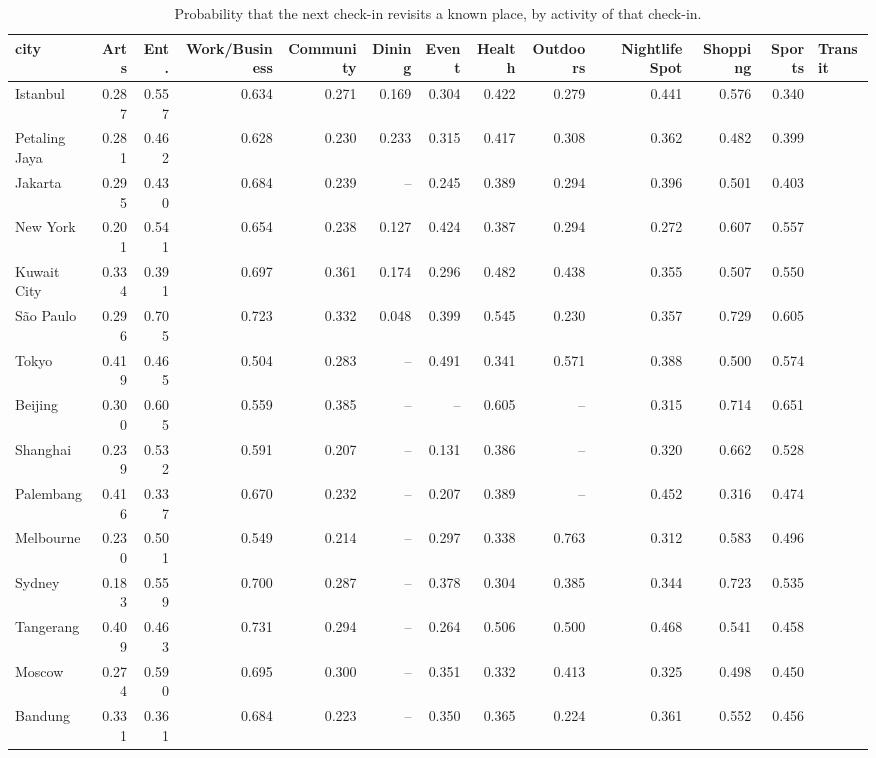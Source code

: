 \begin{table}[t]
\centering\small
\caption{Probability that the next check-in revisits a known place, by activity of that check-in.}
\label{tab:A2_revisit_by_activity}
\begin{tabular}{lrrrrrrrrrrr}
\toprule
city & Arts & Ent. & Work/Business & Community & Dining & Event & Health & Outdoors & Nightlife Spot & Shopping & Sports & Transit \\
\midrule
Istanbul & 0.287 & 0.557 & 0.634 & 0.271 & 0.169 & 0.304 & 0.422 & 0.279 & 0.441 & 0.576 & 0.340 \\
Petaling Jaya & 0.281 & 0.462 & 0.628 & 0.230 & 0.233 & 0.315 & 0.417 & 0.308 & 0.362 & 0.482 & 0.399 \\
Jakarta & 0.295 & 0.430 & 0.684 & 0.239 & -- & 0.245 & 0.389 & 0.294 & 0.396 & 0.501 & 0.403 \\
New York & 0.201 & 0.541 & 0.654 & 0.238 & 0.127 & 0.424 & 0.387 & 0.294 & 0.272 & 0.607 & 0.557 \\
Kuwait City & 0.334 & 0.391 & 0.697 & 0.361 & 0.174 & 0.296 & 0.482 & 0.438 & 0.355 & 0.507 & 0.550 \\
São Paulo & 0.296 & 0.705 & 0.723 & 0.332 & 0.048 & 0.399 & 0.545 & 0.230 & 0.357 & 0.729 & 0.605 \\
Tokyo & 0.419 & 0.465 & 0.504 & 0.283 & -- & 0.491 & 0.341 & 0.571 & 0.388 & 0.500 & 0.574 \\
Beijing & 0.300 & 0.605 & 0.559 & 0.385 & -- & -- & 0.605 & -- & 0.315 & 0.714 & 0.651 \\
Shanghai & 0.239 & 0.532 & 0.591 & 0.207 & -- & 0.131 & 0.386 & -- & 0.320 & 0.662 & 0.528 \\
Palembang & 0.416 & 0.337 & 0.670 & 0.232 & -- & 0.207 & 0.389 & -- & 0.452 & 0.316 & 0.474 \\
Melbourne & 0.230 & 0.501 & 0.549 & 0.214 & -- & 0.297 & 0.338 & 0.763 & 0.312 & 0.583 & 0.496 \\
Sydney & 0.183 & 0.559 & 0.700 & 0.287 & -- & 0.378 & 0.304 & 0.385 & 0.344 & 0.723 & 0.535 \\
Tangerang & 0.409 & 0.463 & 0.731 & 0.294 & -- & 0.264 & 0.506 & 0.500 & 0.468 & 0.541 & 0.458 \\
Moscow & 0.274 & 0.590 & 0.695 & 0.300 & -- & 0.351 & 0.332 & 0.413 & 0.325 & 0.498 & 0.450 \\
Bandung & 0.331 & 0.361 & 0.684 & 0.223 & -- & 0.350 & 0.365 & 0.224 & 0.361 & 0.552 & 0.456 \\
\bottomrule
\end{tabular}
\end{table}

